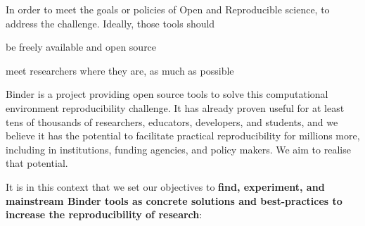 In order to meet the goals or policies of Open and Reproducible science,
 to address the challenge. Ideally, those tools should
\begin{compactenum}
\item be freely available and open source
\item meet researchers where they are, as much as possible
\end{compactenum}

Binder is a project providing open source tools to solve this computational environment reproducibility challenge.
It has already proven useful for at least tens of thousands of researchers, educators, developers, and students,
and we believe it has the potential to facilitate practical reproducibility for millions more,
including in institutions, funding agencies, and policy makers.
We aim to realise that potential.


It is in this context that we set our objectives to \textbf{find, experiment, and mainstream Binder tools as concrete solutions and best-practices to increase the reproducibility of research}:


